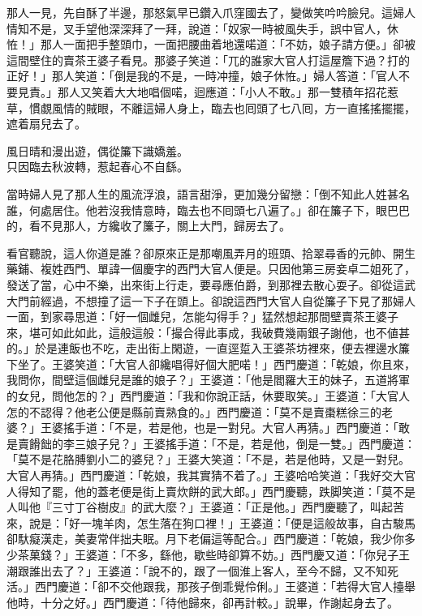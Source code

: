 那人一見，先自酥了半邊，那怒氣早已鑽入爪窪國去了，變做笑吟吟臉兒。這婦人情知不是，叉手望他深深拜了一拜，說道：「奴家一時被風失手，誤中官人，休恠！」那人一面把手整頭巾，一面把腰曲着地還喏道：「不妨，娘子請方便。」卻被這間壁住的賣茶王婆子看見。{}那婆子笑道：「兀的誰家大官人打這屋簷下過？打的正好！」那人笑道：「倒是我的不是，一時冲撞，娘子休恠。」婦人答道：「官人不要見責。」那人又笑着大大地唱個喏，迴應道：「小人不敢。」那一雙積年招花惹草，慣覷風情的賊眼，不離這婦人身上，{}臨去也囘頭了七八囘，方一直搖搖擺擺，遮着扇兒去了。

\begin{myquote}
風日晴和漫出遊，偶從簾下識嬌羞。\\只因臨去秋波轉，惹起春心不自繇。
\end{myquote}

當時婦人見了那人生的風流浮浪，語言甜淨，更加幾分留戀：「倒不知此人姓甚名誰，何處居住。他若沒我情意時，臨去也不囘頭七八遍了。」{}卻在簾子下，眼巴巴的，看不見那人，方纔收了簾子，關上大門，歸房去了。

看官聽說，這人你道是誰？卻原來正是那嘲風弄月的班頭、拾翠尋香的元帥、開生藥鋪、複姓西門、單諱一個慶字的西門大官人便是。只因他第三房妾卓二姐死了，發送了當，心中不樂，出來街上行走，要尋應伯爵，到那裡去散心耍子。卻從這武大門前經過，不想撞了這一下子在頭上。卻說這西門大官人自從簾子下見了那婦人一面，到家尋思道：「好一個雌兒，怎能勾得手？」猛然想起那間壁賣茶王婆子來，堪可如此如此，這般這般：「撮合得此事成，我破費幾兩銀子謝他，也不値甚的。」於是連飯也不吃，走出街上閑遊，一直逕踅入王婆茶坊裡來，便去裡邊水簾下坐了。王婆笑道：「大官人卻纔唱得好個大肥喏！」西門慶道：「乾娘，你且來，我問你，間壁這個雌兒是誰的娘子？」王婆道：「他是閻羅大王的妹子，五道將軍的女兒，{}問他怎的？」西門慶道：「我和你說正話，休要取笑。」王婆道：「大官人怎的不認得？他老公便是縣前賣熟食的。」{}西門慶道：「莫不是賣棗糕徐三的老婆？」王婆搖手道：「不是，若是他，也是一對兒。大官人再猜。」西門慶道：「敢是賣餶飿的李三娘子兒？」王婆搖手道：「不是，若是他，倒是一雙。」西門慶道：「莫不是花胳膊劉小二的婆兒？」王婆大笑道：「不是，若是他時，又是一對兒。大官人再猜。」西門慶道：「乾娘，我其實猜不着了。」王婆哈哈笑道：「我好交大官人得知了罷，他的蓋老便是街上賣炊餅的武大郎。」西門慶聽，跌脚笑道：「莫不是人叫他『三寸丁谷樹皮』的武大麼？」王婆道：「正是他。」西門慶聽了，叫起苦來，說是：「好一塊羊肉，怎生落在狗口裡！」王婆道：「便是這般故事，自古駿馬卻馱癡漢走，美妻常伴拙夫眠。月下老偏這等配合。」西門慶道：「乾娘，我少你多少茶菓錢？」{}王婆道：「不多，繇他，歇些時卻算不妨。」西門慶又道：「你兒子王潮跟誰出去了？」王婆道：「說不的，跟了一個淮上客人，至今不歸，又不知死活。」西門慶道：「卻不交他跟我，那孩子倒乖覺伶俐。」王婆道：「若得大官人擡舉他時，十分之好。」西門慶道：「待他歸來，卻再計較。」說畢，作謝起身去了。

